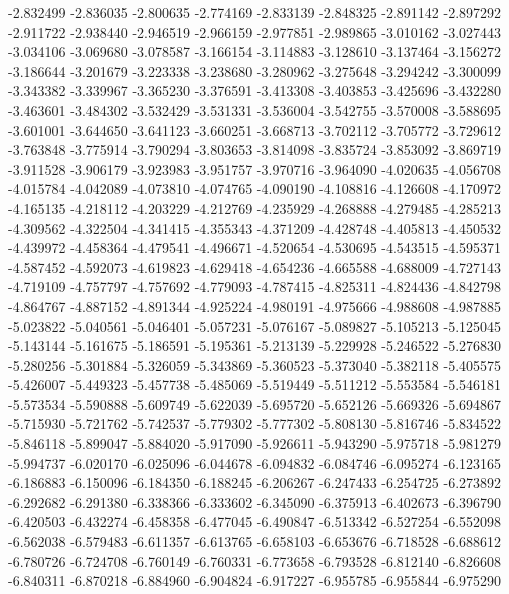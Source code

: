 -2.832499
-2.836035
-2.800635
-2.774169
-2.833139
-2.848325
-2.891142
-2.897292
-2.911722
-2.938440
-2.946519
-2.966159
-2.977851
-2.989865
-3.010162
-3.027443
-3.034106
-3.069680
-3.078587
-3.166154
-3.114883
-3.128610
-3.137464
-3.156272
-3.186644
-3.201679
-3.223338
-3.238680
-3.280962
-3.275648
-3.294242
-3.300099
-3.343382
-3.339967
-3.365230
-3.376591
-3.413308
-3.403853
-3.425696
-3.432280
-3.463601
-3.484302
-3.532429
-3.531331
-3.536004
-3.542755
-3.570008
-3.588695
-3.601001
-3.644650
-3.641123
-3.660251
-3.668713
-3.702112
-3.705772
-3.729612
-3.763848
-3.775914
-3.790294
-3.803653
-3.814098
-3.835724
-3.853092
-3.869719
-3.911528
-3.906179
-3.923983
-3.951757
-3.970716
-3.964090
-4.020635
-4.056708
-4.015784
-4.042089
-4.073810
-4.074765
-4.090190
-4.108816
-4.126608
-4.170972
-4.165135
-4.218112
-4.203229
-4.212769
-4.235929
-4.268888
-4.279485
-4.285213
-4.309562
-4.322504
-4.341415
-4.355343
-4.371209
-4.428748
-4.405813
-4.450532
-4.439972
-4.458364
-4.479541
-4.496671
-4.520654
-4.530695
-4.543515
-4.595371
-4.587452
-4.592073
-4.619823
-4.629418
-4.654236
-4.665588
-4.688009
-4.727143
-4.719109
-4.757797
-4.757692
-4.779093
-4.787415
-4.825311
-4.824436
-4.842798
-4.864767
-4.887152
-4.891344
-4.925224
-4.980191
-4.975666
-4.988608
-4.987885
-5.023822
-5.040561
-5.046401
-5.057231
-5.076167
-5.089827
-5.105213
-5.125045
-5.143144
-5.161675
-5.186591
-5.195361
-5.213139
-5.229928
-5.246522
-5.276830
-5.280256
-5.301884
-5.326059
-5.343869
-5.360523
-5.373040
-5.382118
-5.405575
-5.426007
-5.449323
-5.457738
-5.485069
-5.519449
-5.511212
-5.553584
-5.546181
-5.573534
-5.590888
-5.609749
-5.622039
-5.695720
-5.652126
-5.669326
-5.694867
-5.715930
-5.721762
-5.742537
-5.779302
-5.777302
-5.808130
-5.816746
-5.834522
-5.846118
-5.899047
-5.884020
-5.917090
-5.926611
-5.943290
-5.975718
-5.981279
-5.994737
-6.020170
-6.025096
-6.044678
-6.094832
-6.084746
-6.095274
-6.123165
-6.186883
-6.150096
-6.184350
-6.188245
-6.206267
-6.247433
-6.254725
-6.273892
-6.292682
-6.291380
-6.338366
-6.333602
-6.345090
-6.375913
-6.402673
-6.396790
-6.420503
-6.432274
-6.458358
-6.477045
-6.490847
-6.513342
-6.527254
-6.552098
-6.562038
-6.579483
-6.611357
-6.613765
-6.658103
-6.653676
-6.718528
-6.688612
-6.780726
-6.724708
-6.760149
-6.760331
-6.773658
-6.793528
-6.812140
-6.826608
-6.840311
-6.870218
-6.884960
-6.904824
-6.917227
-6.955785
-6.955844
-6.975290
